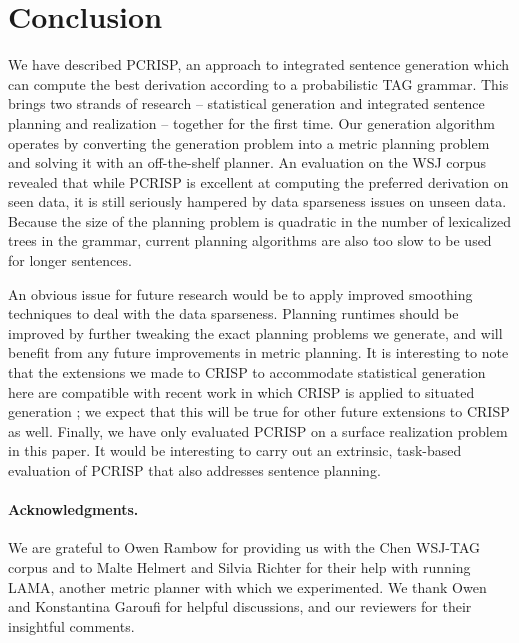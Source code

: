 \section{Conclusion}
\label{sec:conclusion}

We have described PCRISP, an approach to integrated sentence generation which can compute the best derivation according to a probabilistic TAG grammar.  This brings two strands of research -- statistical generation and integrated sentence planning and realization -- together for the first time.  Our generation algorithm operates by converting the generation problem into a metric planning problem and solving it with an off-the-shelf planner.  An evaluation on the WSJ corpus revealed that while PCRISP is excellent at computing the preferred derivation on seen data, it is still seriously hampered by data sparseness issues on unseen data.  Because the size of the planning problem is quadratic in the number of lexicalized trees in the grammar, current planning algorithms are also too slow to be used for longer sentences.

An obvious issue for future research would be to apply improved smoothing techniques to deal with the data sparseness.  Planning runtimes should be improved by further tweaking the exact planning problems we generate, and will benefit from any future improvements in metric planning.  It is interesting to note that the extensions we made to CRISP to accommodate statistical generation here are compatible with recent work in which CRISP is applied to situated generation \cite{garoufikoller2010}; we expect that this will be true for other future extensions to CRISP as well.  Finally, we have only evaluated PCRISP on a surface realization problem in this paper.  It would be interesting to carry out an extrinsic, task-based evaluation of PCRISP that also addresses sentence planning.

\paragraph{Acknowledgments.} We are grateful to Owen Rambow for providing us with the Chen WSJ-TAG corpus and to Malte Helmert and Silvia Richter for their help with running LAMA, another metric planner with which we experimented. We thank Owen and Konstantina Garoufi for helpful discussions, and our reviewers for their insightful comments.






